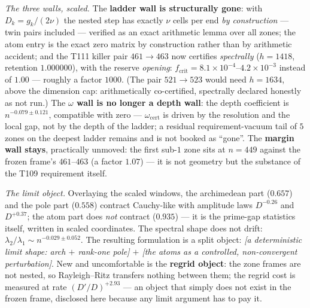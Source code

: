 \documentclass[11pt,a4paper]{article}
\begin{document}
\emph{The three walls, scaled.} The \textbf{ladder wall is structurally gone}: with $D_k=g_k/(2\nu)$
the nested step has exactly $\nu$ cells per end \emph{by construction} --- twin pairs included ---
verified as an exact arithmetic lemma over all zones; the atom entry is the exact zero matrix by
construction rather than by arithmetic accident; and the T111 killer pair $461\to463$ now certifies
\emph{spectrally} ($h=1418$, retention $1.000000$), with the reserve \emph{opening}:
$f_{\mathrm{crit}}=8.1\times10^{-4}$--$4.2\times10^{-3}$ instead of $1.00$ --- roughly a factor
$1000$. (The pair $521\to523$ would need $h=1634$, above the dimension cap: arithmetically
co-certified, spectrally declared honestly as not run.) The \textbf{$\omega$ wall is no longer a
depth wall}: the depth coefficient is $n^{-0.079\pm0.121}$, compatible with zero ---
$\omega_{\mathrm{cert}}$ is driven by the resolution and the local gap, not by the depth of the
ladder; a residual requirement-vacuum tail of $5$ zones on the deepest ladder remains and is not
booked as ``gone''. The \textbf{margin wall stays}, practically unmoved: the first sub-$1$ zone
sits at $n=449$ against the frozen frame's $461$--$463$ (a factor $1.07$) --- it is not geometry
but the substance of the T109 requirement itself.

\emph{The limit object.} Overlaying the scaled windows, the archimedean part ($0.657$) and the pole
part ($0.558$) contract Cauchy-like with amplitude laws $D^{-0.26}$ and $D^{+0.37}$; the atom part
does \emph{not} contract ($0.935$) --- it is the prime-gap statistics itself, written in scaled
coordinates. The spectral shape does not drift: $\lambda_2/\lambda_1\sim n^{-0.029\pm0.052}$. The
resulting formulation is a split object: \emph{[a deterministic limit shape: arch $+$ rank-one
pole] $+$ [the atoms as a controlled, non-convergent perturbation]}. New and uncomfortable is the
\textbf{regrid object}: the zone frames are not nested, so Rayleigh--Ritz transfers nothing between
them; the regrid cost is measured at rate $(D'/D)^{+2.93}$ --- an object that simply does not exist
in the frozen frame, disclosed here because any limit argument has to pay it.
\end{document}
